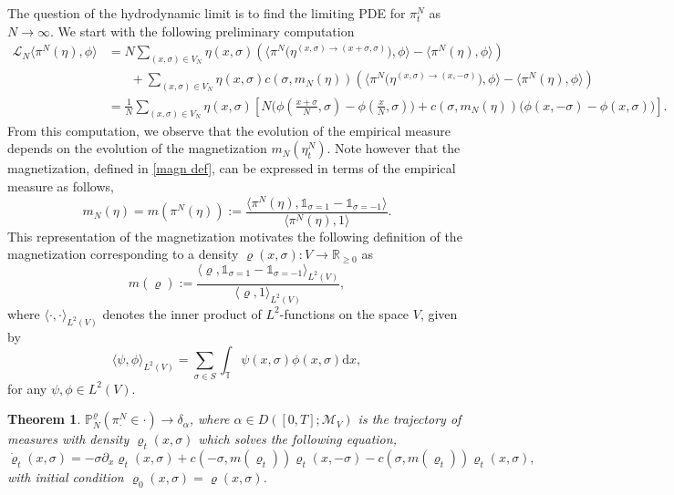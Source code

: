 \documentclass[11pt]{article}
\numberwithin{equation}{section}
\theoremstyle{definition}
\theoremstyle{plain}
\newtheorem{Theorem}{Theorem}[section]
\newcommand{\p}{\mathbb{P}}
\newcommand{\dd}{\mathrm{d}}
\newcommand{\nn}{\nonumber}
\begin{document}
The question of the hydrodynamic limit is to find the limiting PDE for  $\pi^N_{t}$ as $N\to\infty$.  
We start with the following preliminary computation
    \begin{align}
        \mathscr{L}_N \langle\pi^N(\eta),\phi\rangle
        &\nn= N\sum_{(x,\sigma) \in V_N} \eta(x,\sigma) \left(\big\langle\pi^N\big(\eta^{(x,\sigma)\to(x+\sigma,\sigma)}\big), \phi\big\rangle - \langle \pi^N(\eta),\phi\rangle\right)\\
        &\ \ \ \ \ \ \ \ + \sum_{(x,\sigma) \in V_N} \eta(x,\sigma) c(\sigma, m_N(\eta))\left(\big\langle\pi^N\big(\eta^{(x,\sigma)\to(x,-\sigma)}\big), \phi\big\rangle - \langle \pi^N(\eta),\phi\rangle\right)\\
        &\nn=  \frac{1}{N} \sum_{(x,\sigma) \in V_N} \eta(x,\sigma) \left[N\big(\phi(\tfrac{x+\sigma}{N},\sigma) - \phi(\tfrac{x}{N},\sigma)\big) + c(\sigma,m_N(\eta))\big(\phi(x,-\sigma)- \phi(x,\sigma)\big) \right].
    \end{align}
From this computation, we observe that the evolution of the empirical measure  depends on the evolution of the magnetization $m_N(\eta^N_t)$. Note however that the magnetization, defined in \eqref{magn def}, can be expressed in terms of the empirical measure as follows, 
    \begin{equation}\label{mag from emp}
        m_N(\eta) = m(\pi^N(\eta)) := \frac{\langle\pi^N(\eta), \mathds{1}_{\sigma =1} - \mathds{1}_{\sigma=-1}\rangle}{\langle \pi^N(\eta),1\rangle}.
    \end{equation}
This representation of the magnetization motivates the following definition of the magnetization corresponding to a density $\varrho(x,\sigma): V\to \mathbb{R}_{\geq0}$ as 
    \begin{equation}\label{mag def}
        m(\varrho) := \frac{\langle \varrho, \mathds{1}_{\sigma=1} - \mathds{1}_{\sigma=-1}\rangle_{L^2(V)}}{\langle \varrho, 1\rangle_{L^2(V)}},
    \end{equation}
where $\langle\cdot,\cdot \rangle_{L^2(V)}$  denotes the inner product of $L^2$-functions on the space $V$, given by 
    \begin{equation}
        \langle \psi, \phi\rangle_{L^2(V)} = \sum_{\sigma \in S} \int_{\mathbb{T}} \psi(x,\sigma) \phi(x,\sigma)\dd x,
    \end{equation}
for any $\psi,\phi \in L^2(V)$. 
\begin{Theorem}\label{hydro theorem}
    $\p^\varrho_N(\pi^N_{\cdot}\in \cdot) \to \delta_{\alpha}$, where $\alpha\in D([0,T];\mathcal{M}_V)$ is the trajectory of measures with density $\varrho_t(x,\sigma)$ 
    which solves the following  equation,
    \begin{equation}\label{PDE}
            \dot{\varrho}_t(x,\sigma) = -\sigma \partial_x \varrho_t(x,\sigma) + c(-\sigma,m(\varrho_t))\varrho_t(x,-\sigma) - c(\sigma,m(\varrho_t))\varrho_t(x,\sigma),
    \end{equation}
    with initial condition $\varrho_0(x,\sigma) = \varrho(x,\sigma)$.
\end{Theorem}
\end{document}

